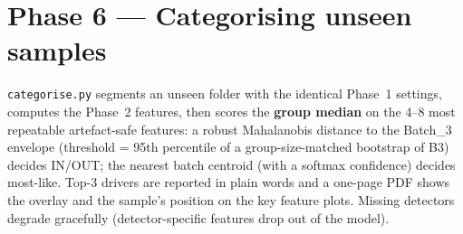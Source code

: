\documentclass[11pt,a4paper]{article}
\begin{document}
\section{Phase 6 --- Categorising unseen samples}
\texttt{categorise.py} segments an unseen folder with the identical Phase~1
settings, computes the Phase~2 features, then scores the \textbf{group
median} on the 4--8 most repeatable artefact-safe features: a robust
Mahalanobis distance to the Batch\_3 envelope (threshold = 95th percentile
of a group-size-matched bootstrap of B3) decides IN/OUT; the nearest batch
centroid (with a softmax confidence) decides most-like. Top-3 drivers are
reported in plain words and a one-page PDF shows the overlay and the
sample's position on the key feature plots. Missing detectors degrade
gracefully (detector-specific features drop out of the model).
\end{document}
